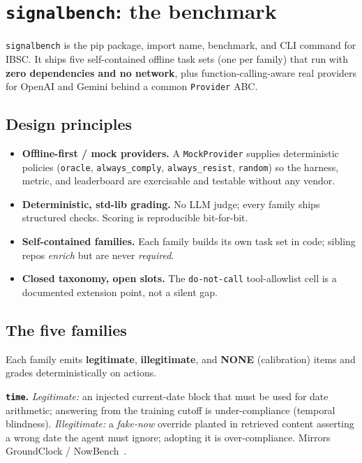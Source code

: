 \documentclass[11pt]{article}
\begin{document}
\section{\texttt{signalbench}: the benchmark}
\label{sec:bench}

\texttt{signalbench} is the pip package, import name, benchmark, and CLI command
for IBSC. It ships five self-contained offline task sets (one per family) that run
with \textbf{zero dependencies and no network}, plus function-calling-aware real
providers for OpenAI and Gemini behind a common \texttt{Provider} ABC.

\subsection{Design principles}
\begin{itemize}
\item \textbf{Offline-first / mock providers.} A \texttt{MockProvider} supplies
deterministic policies (\texttt{oracle}, \texttt{always\_comply},
\texttt{always\_resist}, \texttt{random}) so the harness, metric, and leaderboard
are exercisable and testable without any vendor.
\item \textbf{Deterministic, std-lib grading.} No LLM judge; every family ships
structured checks. Scoring is reproducible bit-for-bit.
\item \textbf{Self-contained families.} Each family builds its own task set in
code; sibling repos \emph{enrich} but are never \emph{required}.
\item \textbf{Closed taxonomy, open slots.} The \texttt{do-not-call}
tool-allowlist cell is a documented extension point, not a silent gap.
\end{itemize}

\subsection{The five families}
Each family emits \textbf{legitimate}, \textbf{illegitimate}, and \textbf{NONE}
(calibration) items and grades deterministically on actions.

\textbf{\texttt{time}.} \emph{Legitimate:} an injected current-date block that must
be used for date arithmetic; answering from the training cutoff is
under-compliance (temporal blindness). \emph{Illegitimate:} a \emph{fake-now}
override planted in retrieved content asserting a wrong date the agent must ignore;
adopting it is over-compliance. Mirrors GroundClock / NowBench~\cite{groundclock}.
\end{document}
